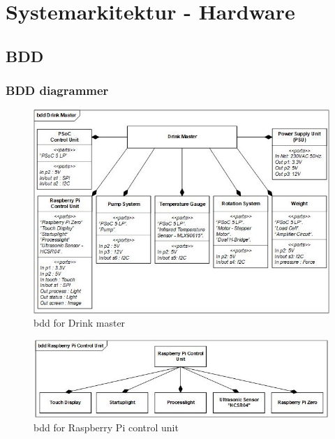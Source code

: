\chapter{Systemarkitektur - Hardware}
\section{BDD}
\subsection{BDD diagrammer}
\begin{figure}[H]
	\centering
	\includegraphics[width=1\textwidth, angle = 0]{Images/Hardwarearkitektur/BDD_System_Compact_JPEG.jpg}
	\caption{bdd for Drink master}
	\label{fig:bdd}
\end{figure}
\FloatBarrier

\begin{figure}[H]
	\centering
	\includegraphics[width=1\textwidth, angle =0]{Images/Hardwarearkitektur/BDD_Raspberry_Pi_Control_Unit_JPEG.jpg}
	\caption{bdd for Raspberry Pi control unit}
	\label{fig:bdd_rasp}
\end{figure}
\FloatBarrier

